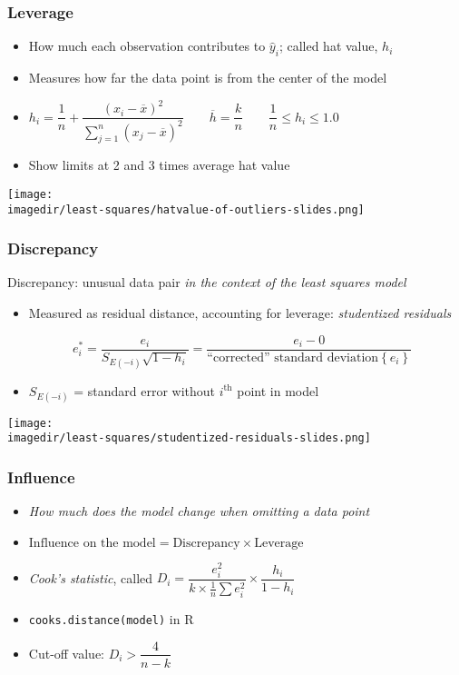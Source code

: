 \begin{frame}\frametitle{Leverage}
	\begin{itemize}
		\item	How much each observation contributes to $\hat{y}_i$; called hat value, $h_i$
		\item	Measures how far the data point is from the center of the model
		\item	$ h_i = \dfrac{1}{n} + \dfrac{\left(x_i -\overline{x}\right)^2}{\sum_{j=1}^{n}{\left(x_j -\overline{x}\right)^2}} \qquad \overline{h} = \dfrac{k}{n} \qquad \dfrac{1}{n} \leq h_i \leq 1.0$
		\item	Show limits at 2 and 3 times average hat value
	\end{itemize}
	\begin{center}
		\texttt{[image: \\imagedir/least-squares/hatvalue-of-outliers-slides.png]}
	\end{center}
\end{frame}

\begin{frame}\frametitle{Discrepancy}

	Discrepancy: unusual data pair \emph{in the context of the least squares model}
	\begin{itemize}
		\item	Measured as residual distance, accounting for leverage: \emph{studentized residuals}
	\end{itemize}
	$$ \quad e_i^* = \dfrac{e_i}{S_{E(-i)}\sqrt{1-h_i}} = \dfrac{e_i - 0}{\text{``corrected'' standard deviation}\left\{e_i \right\}} $$
	\begin{itemize}
		\item	$S_{E(-i)}$ = standard error without $i^\text{th}$ point in model
	\end{itemize}
	\begin{center}
		\texttt{[image: \\imagedir/least-squares/studentized-residuals-slides.png]}
	\end{center}
\end{frame}

\begin{frame}\frametitle{Influence}
	\begin{itemize}
		\item	\emph{How much does the model change when omitting a data point}
		\item	$\text{Influence on the model} = \text{Discrepancy} \times \text{Leverage} $
		\item	\emph{Cook's statistic}, called $D_i = \dfrac{e_i^2}{k \times \frac{1}{n}\sum{e_i^2}} \times \dfrac{h_i}{1-h_i} $
		\item	\texttt{cooks.distance(model)} in R
		\item	Cut-off value: $D_i > \dfrac{4}{n-k} $
	\end{itemize}
\end{frame}

